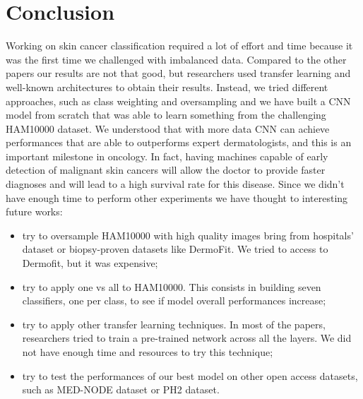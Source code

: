 \section{Conclusion} \label{conclusion}
	
	Working on skin cancer classification required a lot of effort and time because it was the first time we challenged with imbalanced data. 
	Compared to the other papers our results are not that good, but researchers used transfer learning and well-known architectures to obtain their results. Instead, we tried different approaches, such as class weighting and oversampling and we have built a CNN model from scratch that was able to learn something from the challenging HAM10000 dataset. 
	We understood that with more data CNN can achieve performances that are able to outperforms expert dermatologists, and this is an important milestone in oncology. In fact, having machines capable of early detection of malignant skin cancers will allow the doctor to provide faster diagnoses and will lead to a high survival rate for this disease. Since we didn't have enough time to perform other experiments we have thought to interesting future works:

	\begin{itemize}
		\item try to oversample HAM10000 with high quality images bring from hospitals' dataset or biopsy-proven datasets like DermoFit\cite{dermofit}. We tried to access to Dermofit, but it was expensive;
		\item try to apply one vs all to HAM10000. This consists in building seven classifiers, one per class, to see if model overall performances increase;
		\item try to apply other transfer learning techniques. In most of the papers, researchers tried to train a pre-trained network across all the layers. We did not have enough time and resources to try this technique;
		\item try to test the performances of our best model on other open access datasets, such as MED-NODE dataset\cite{mednode} or PH2 dataset\cite{ph2}. 	
	\end{itemize}